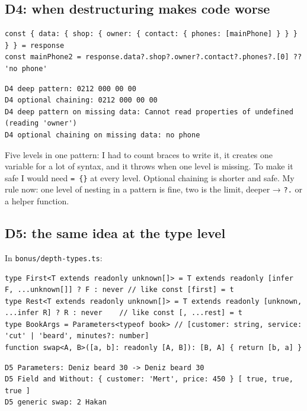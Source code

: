 \subsection{D4: when destructuring makes code worse}\label{d4-when-destructuring-makes-code-worse}

\begin{lstlisting}
const { data: { shop: { owner: { contact: { phones: [mainPhone] } } } } } = response
const mainPhone2 = response.data?.shop?.owner?.contact?.phones?.[0] ?? 'no phone'
\end{lstlisting}

\begin{lstlisting}
D4 deep pattern: 0212 000 00 00
D4 optional chaining: 0212 000 00 00
D4 deep pattern on missing data: Cannot read properties of undefined (reading 'owner')
D4 optional chaining on missing data: no phone
\end{lstlisting}

Five levels in one pattern: I had to count braces to write it, it creates one variable for a lot of syntax, and it throws when one
level is missing. To make it safe I would need \passthrough{\lstinline!= \{\}!} at every level. Optional chaining is shorter and safe. My rule now: one level of
nesting in a pattern is fine, two is the limit, deeper → \passthrough{\lstinline!?.!} or a helper function.

\subsection{D5: the same idea at the type level}\label{d5-the-same-idea-at-the-type-level}

In \passthrough{\lstinline!bonus/depth-types.ts!}:

\begin{lstlisting}
type First<T extends readonly unknown[]> = T extends readonly [infer F, ...unknown[]] ? F : never // like const [first] = t
type Rest<T extends readonly unknown[]> = T extends readonly [unknown, ...infer R] ? R : never    // like const [, ...rest] = t
type BookArgs = Parameters<typeof book> // [customer: string, service: 'cut' | 'beard', minutes?: number]
function swap<A, B>([a, b]: readonly [A, B]): [B, A] { return [b, a] }
\end{lstlisting}

\begin{lstlisting}
D5 Parameters: Deniz beard 30 -> Deniz beard 30
D5 Field and Without: { customer: 'Mert', price: 450 } [ true, true, true ]
D5 generic swap: 2 Hakan
\end{lstlisting}

